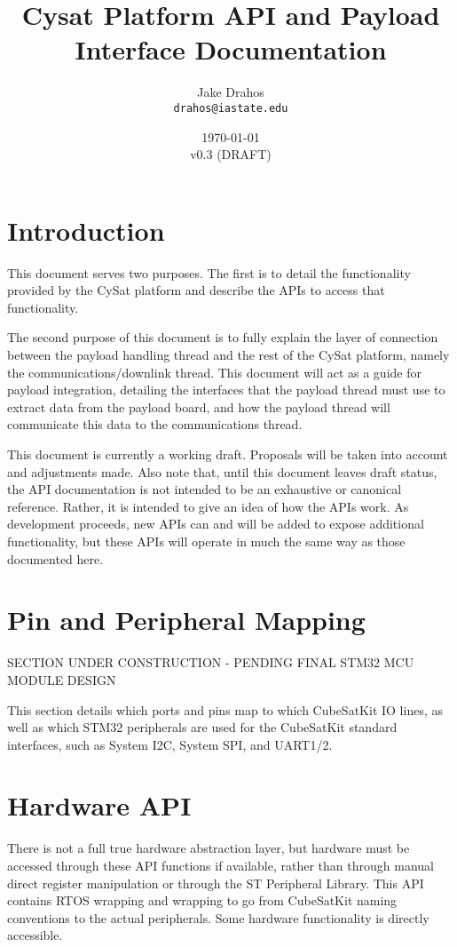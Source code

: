 \documentclass{article}
\begin{document}
\title{Cysat Platform API and Payload Interface Documentation}
\author{Jake Drahos \\ \texttt{drahos@iastate.edu}}
\date{\today\\v0.3 (DRAFT)}

\maketitle

\tableofcontents

\section{Introduction}
This document serves two purposes. The first is to detail the functionality 
provided by the CySat platform and
describe the APIs to access that functionality.

The second purpose of this document is to fully explain the layer of connection
between the payload handling thread and the rest of the CySat platform, namely
the communications/downlink thread. This document will act as a guide for
payload integration, detailing the interfaces that the payload thread must
 use
to extract data from the payload board, and how the payload thread will 
communicate this data to the communications thread.

This document is currently a working draft. Proposals will be taken into account
and adjustments made. Also note that, until this document leaves draft status,
the API documentation is not intended to be an exhaustive or canonical
reference. Rather, it is intended to give an idea of how the APIs work. As
development proceeds, new APIs can and will be added to expose additional
functionality, but these APIs will operate in much the same way as those
documented here.

\section{Pin and Peripheral Mapping}

SECTION UNDER CONSTRUCTION - PENDING FINAL STM32 MCU MODULE DESIGN

This section details which ports and pins map to which CubeSatKit IO lines,
as well as which STM32 peripherals are used for the CubeSatKit standard 
interfaces, such as System I2C, System SPI, and UART1/2.

\section{Hardware API}
There is not a full true hardware abstraction layer, but hardware must be
accessed through these API functions if available, rather than through manual
direct register manipulation or through the ST Peripheral Library. This API
contains RTOS wrapping and wrapping to go from CubeSatKit naming conventions
to the actual peripherals. Some hardware functionality is directly accessible.
\\
\end{document}
